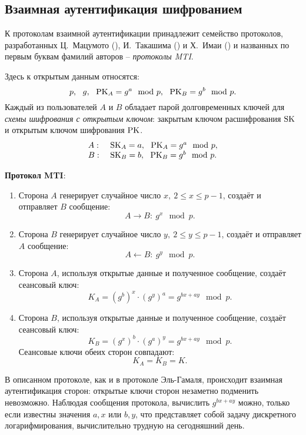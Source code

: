 \subsection{Взаимная аутентификация шифрованием}

К протоколам взаимной аутентификации принадлежит семейство протоколов, разработанных Ц.~Мацумото (), И.~Такашима () и Х.~Имаи () и названных по первым буквам фамилий авторов -- \emph{протоколы MTI}.

Здесь к открытым данным относятся:
    \[ p, ~~ g, ~~ \textrm{PK}_A = g^a \mod p, ~~ \textrm{PK}_B = g^b \mod p. \]
Каждый из пользователей $A$ и $B$ обладает парой долговременных ключей для \emph{схемы шифрования с открытым ключом}: закрытым ключом расшифрования $\textrm{SK}$ и открытым ключом шифрования $\textrm{PK}$.
\[ \begin{array}{ll}
    A: & ~ \textrm{SK}_A = a, ~~ \textrm{PK}_A = g^a \mod p, \\
    B: & ~ \textrm{SK}_B = b, ~~ \textrm{PK}_B = g^b \mod p. \\
\end{array} \]

\textbf{Протокол MTI}:
\begin{enumerate}
    \item Сторона $A$ генерирует случайное число $x, ~ 2\leq x\leq p-1$, создаёт и отправляет $B$ сообщение:
        \[ A \rightarrow B: ~ g^x \mod p. \]
    \item Сторона $B$ генерирует случайное число $y, ~ 2\leq y\leq p-1$, создаёт и отправляет $A$ сообщение:
        \[ A \leftarrow B: ~ g^y \mod p. \]
    \item Сторона $A$, используя открытые данные и полученное сообщение, создаёт сеансовый ключ:
        \[ K_A = (g^b)^x \cdot (g^y)^a = g^{bx+ay} \mod p. \]
    \item Сторона $B$, используя открытые данные и полученное сообщение, создаёт сеансовый ключ:
        \[ K_B = (g^x)^b \cdot (g^a)^y = g^{bx+ay} \mod p. \]
        Сеансовые ключи обеих сторон совпадают:
        \[ K_{A} =K_{B} = K. \]
\end{enumerate}

В описанном протоколе, как и в протоколе Эль-Гамаля, происходит взаимная аутентификация сторон: открытые ключи сторон незаметно подменить невозможно. Наблюдая сообщения протокола, вычислить $g^{bx+ay}$ можно, только если известны значения $a,x$ или $b,y$, что представляет собой задачу дискретного логарифмирования, вычислительно трудную на сегодняшний день.
